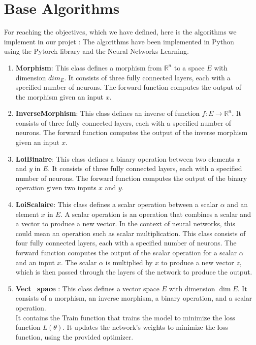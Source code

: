 \documentclass{report}
\begin{document}
\section{Base Algorithms}
    For reaching the objectives, which we have defined, here is the algorithms we implement in our projet  : 
    The algorithms have been implemented in Python using the Pytorch library and the Neural Networks Learning.\\
    \begin{enumerate}
        \item \textbf{Morphism}: This class defines a morphism from 
        $\mathbb{R}^n$ to a space $E$ with dimension $dim_E$. 
        It consists of three fully connected layers, each with 
        a specified number of neurons. The forward function computes 
        the output of the morphism given an input $x$.
        \item \textbf{InverseMorphism}: This class defines an inverse
        of function $f: E \rightarrow \mathbb{R}^n$. It consists of
        three fully connected layers, each with a specified number
        of neurons. The forward function computes the output of the
        inverse morphism given an input $x$.
        \item \textbf{LoiBinaire}: This class defines a binary operation 
        between two elements $x$ and $y$ in $E$. It consists of three 
        fully connected layers, each with a specified number of neurons. 
        The forward function computes the output of the binary operation 
        given two inputs $x$ and $y$.
        \item \textbf{LoiScalaire}: 
        This class defines a scalar operation between a scalar $\alpha$ and an element $x$ in $E$. A scalar operation is an operation that combines a scalar and a vector to produce a new vector. In the context of neural networks, this could mean an operation such as scalar multiplication. This class consists of four fully connected layers, each with a specified number of neurons. The forward function computes the output of the scalar operation for a scalar $\alpha$ and an input $x$. The scalar $\alpha$ is multiplied by $x$ to produce a new vector $z$, which is then passed through the layers of the network to produce the output.
        \item \textbf{Vect\_space} : This class defines a vector space $E$ with dimension $\dim{E}$. It consists of a morphism, an inverse morphism, a binary operation, and a scalar operation. 
        \\ 
        It contains the Train function that trains the model to minimize the loss function $L(\theta)$. It updates the network's weights to minimize the loss function, using the provided optimizer. 
    \end{enumerate}
\end{document}
